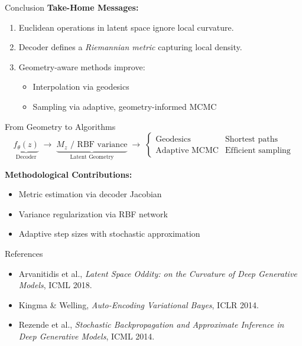 \documentclass[aspectratio=169, 10pt]{beamer}
\begin{document}
\begin{frame}{Conclusion}
  \textbf{Take-Home Messages:}
  \begin{enumerate}
      \item Euclidean operations in latent space ignore local curvature.
      \item Decoder defines a \emph{Riemannian metric} capturing local density.
      \item Geometry-aware methods improve:
      \begin{itemize}
          \item Interpolation via geodesics
          \item Sampling via adaptive, geometry-informed MCMC
      \end{itemize}
  \end{enumerate}

  \vspace{0.3cm}
  \begin{block}{From Geometry to Algorithms}
    $$
    \underbrace{f_\theta(z)}_{\text{Decoder}}
    \;\longrightarrow\;
    \underbrace{M_z \text{ / RBF variance}}_{\text{Latent Geometry}}
    \;\longrightarrow\;
    \begin{cases}
      \text{Geodesics} & \text{Shortest paths} \\
      \text{Adaptive MCMC} & \text{Efficient sampling}
    \end{cases}
    $$
  \end{block}

  \vspace{0.3cm}
  \textbf{Methodological Contributions:}
  \begin{itemize}
      \item Metric estimation via decoder Jacobian
      \item Variance regularization via RBF network
      \item Adaptive step sizes with stochastic approximation
  \end{itemize}

\end{frame}
\begin{frame}{References}
  \footnotesize
  \begin{itemize}
      \item Arvanitidis et al., \textit{Latent Space Oddity: on the Curvature of Deep Generative Models}, ICML 2018.
      \item Kingma & Welling, \textit{Auto-Encoding Variational Bayes}, ICLR 2014.
      \item Rezende et al., \textit{Stochastic Backpropagation and Approximate Inference in Deep Generative Models}, ICML 2014.

  \end{itemize}
\end{frame}
\end{document}
